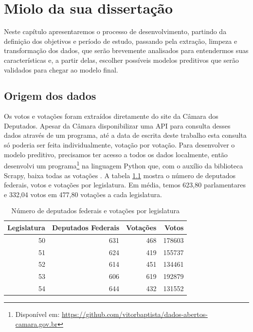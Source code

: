 \documentclass[a4paper,titlepage]{ppgi}\usepackage[]{graphicx}\usepackage[]{color}
\newenvironment{knitrout}{}{} %
\begin{document}
\chapter{Miolo da sua dissertação}\label{cap:miolo}

Neste capítulo apresentaremos o processo de desenvolvimento, partindo da
definição dos objetivos e período de estudo, passando pela extração, limpeza e
transformação dos dados, que serão brevemente analisados para entendermos suas
características e, a partir delas, escolher possíveis modelos preditivos que
serão validados para chegar ao modelo final.

\section{Origem dos dados}




Os votos e votações foram extraídos diretamente do site da Câmara dos
Deputados. Apesar da Câmara disponibilizar uma \gls{API} para consulta desses
dados através de um programa, até a data de escrita deste trabalho esta
consulta só poderia ser feita individualmente, votação por votação. Para
desenvolver o modelo preditivo, precisamos ter acesso a todos os dados
localmente, então desenvolvi um programa\footnote{Disponível em:
\url{https://github.com/vitorbaptista/dados-abertos-camara.gov.br}} na
linguagem Python que, com o auxílio da biblioteca Scrapy, baixa todas as
votações \cite{Python276,Scrapy}. A tabela
\ref{table:estatisticas-legislaturas} mostra o número de deputados federais,
votos e votações por legislatura. Em média, temos 623,80
parlamentares e 332,04 votos em
477,80 votações a cada legislatura.
\nocite{CamaraDosDeputados2015}

\begin{table}
\centering
\begin{knitrout}
\color{fgcolor}
\begin{tabular}{r|r|r|r}
\hline
Legislatura & Deputados Federais & Votações & Votos\\
\hline
50 & 631 & 468 & 178603\\
\hline
51 & 624 & 419 & 155737\\
\hline
52 & 614 & 451 & 134461\\
\hline
53 & 606 & 619 & 192879\\
\hline
54 & 644 & 432 & 131552\\
\hline
\end{tabular}


\end{knitrout}
\caption{Número de deputados federais e votações por legislatura}
\label{table:estatisticas-legislaturas}
\end{table}
\end{document}
